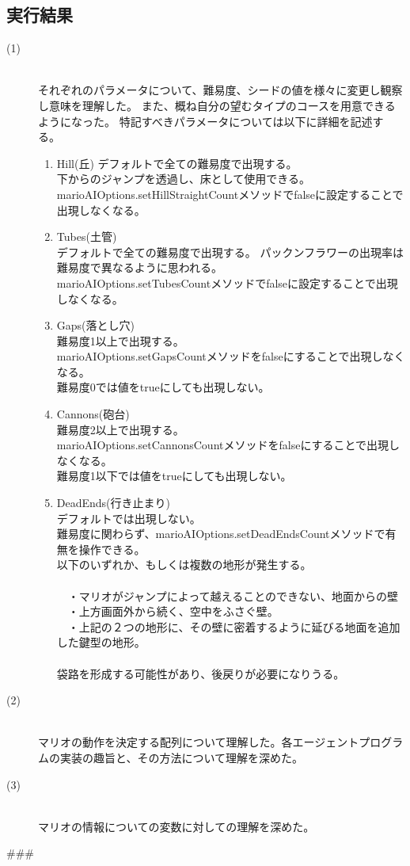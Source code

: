 \documentclass[a4j]{jarticle}
\begin{document}
\subsection{実行結果}
\begin{description}
\item[(1)]~\\
それぞれのパラメータについて、難易度、シードの値を様々に変更し観察し意味を理解した。
また、概ね自分の望むタイプのコースを用意できるようになった。
特記すべきパラメータについては以下に詳細を記述する。
	\begin{enumerate}
	\item Hill(丘)
	デフォルトで全ての難易度で出現する。\\
	下からのジャンプを透過し、床として使用できる。\\
	marioAIOptions.setHillStraightCountメソッドでfalseに設定することで出現しなくなる。
	\item Tubes(土管)　~\\
	デフォルトで全ての難易度で出現する。 パックンフラワーの出現率は難易度で異なるように思われる。\\
	marioAIOptions.setTubesCountメソッドでfalseに設定することで出現しなくなる。
	\item Gaps(落とし穴) ~\\
	難易度1以上で出現する。\\
	marioAIOptions.setGapsCountメソッドをfalseにすることで出現しなくなる。\\
	難易度0では値をtrueにしても出現しない。
	\item Cannons(砲台) ~\\
	難易度2以上で出現する。\\
	marioAIOptions.setCannonsCountメソッドをfalseにすることで出現しなくなる。\\
	難易度1以下では値をtrueにしても出現しない。
	\item DeadEnds(行き止まり) ~\\
	デフォルトでは出現しない。\\
	難易度に関わらず、marioAIOptions.setDeadEndsCountメソッドで有無を操作できる。\\
	以下のいずれか、もしくは複数の地形が発生する。\\
	\\
	　・マリオがジャンプによって越えることのできない、地面からの壁\\
	　・上方画面外から続く、空中をふさぐ壁。\\
	　・上記の２つの地形に、その壁に密着するように延びる地面を追加した鍵型の地形。\\
	\\
	袋路を形成する可能性があり、後戻りが必要になりうる。
	\end{enumerate}
\item[(2)]~\\
マリオの動作を決定する配列について理解した。各エージェントプログラムの実装の趣旨と、その方法について理解を深めた。
\item[(3)]~\\
マリオの情報についての変数に対しての理解を深めた。
\end{description}
###
\end{document}

